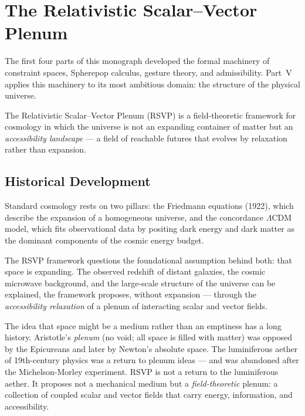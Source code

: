 
\chapter{The Relativistic Scalar–Vector Plenum}



The first four parts of this monograph developed the formal machinery of
constraint spaces, Spherepop calculus, gesture theory, and admissibility.
Part~V applies this machinery to its most ambitious domain: the structure
of the physical universe.

The Relativistic Scalar–Vector Plenum (RSVP) is a field-theoretic framework
for cosmology in which the universe is not an expanding container of matter
but an \emph{accessibility landscape} — a field of reachable futures that
evolves by relaxation rather than expansion.

\section{Historical Development}

Standard cosmology rests on two pillars: the Friedmann equations (1922),
which describe the expansion of a homogeneous universe, and the concordance
$\Lambda$CDM model, which fits observational data by positing dark energy
and dark matter as the dominant components of the cosmic energy budget.

The RSVP framework questions the foundational assumption behind both: that
space is expanding. The observed redshift of distant galaxies, the cosmic
microwave background, and the large-scale structure of the universe can be
explained, the framework proposes, without expansion — through the
\emph{accessibility relaxation} of a plenum of interacting scalar and
vector fields.

\begin{historynote}
  The idea that space might be a medium rather than an emptiness has a long
  history. Aristotle's \emph{plenum} (no void; all space is filled with
  matter) was opposed by the Epicureans and later by Newton's absolute space.
  The luminiferous aether of 19th-century physics was a return to plenum
  ideas — and was abandoned after the Michelson-Morley experiment.
  RSVP is not a return to the luminiferous aether. It proposes not a
  mechanical medium but a \emph{field-theoretic} plenum: a collection of
  coupled scalar and vector fields that carry energy, information, and
  accessibility.
\end{historynote}

